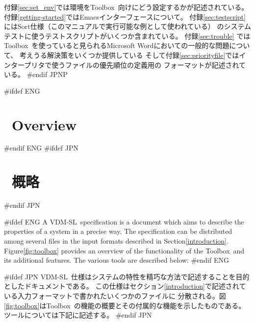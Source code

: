 \documentclass[\pformat,12pt]{article}
\newcommand{\vdmslpp}{VDM-SL}
\newcommand{\Toolbox}{Toolbox}
\newcommand{\vdmslpp}{VDM++}
\newcommand{\Toolbox}{Toolbox}
\begin{document}
付録\ref{sec:set_env}では環境を\Toolbox\ 向けにどう設定するかが記述されている。
付録\ref{getting-started}ではEmacsインターフェースについて。
付録\ref{sec:testscript}にはSort仕様（このマニュアルで実行可能な例として使われている）
のシステムテストに使うテストスクリプトがいくつか含まれている。
付録\ref{sec:trouble} では\Toolbox\ を使っていると見られるMicrosoft Wordにおいての一般的な問題について、
考えうる解決策をいくつか提供している
{そして付録\ref{sec:priorityfile}ではインタープリタで使うファイルの優先順位の定義用の
フォーマットが記述されている。}
#endif JPNP

\newpage

#ifdef ENG
\section{\protect\VDMTools\ Overview}\label{sec:overview}
#endif ENG
#ifdef JPN
\section{\protect\VDMTools\ 概略}\label{sec:overview}
#endif JPN

#ifdef ENG
A \vdmslpp\ specification is a document which aims to describe the
properties of a system in a precise way. The specification can be
distributed among several files in the input formats described in
Section\ref{introduction}.  Figure\ref{fig:toolbox} provides an
overview of the functionality of the \Toolbox\ and its additional
features. The various tools are described below:
#endif ENG

#ifdef JPN
\vdmslpp\ 仕様はシステムの特性を精巧な方法で記述することを目的としたドキュメントである。
この仕様はセクション\ref{introduction}で記述されている入力フォーマットで書かれたいくつかのファイルに
分散される。図\ref{fig:toolbox}は\Toolbox\ の機能の概要とその付属的な機能を示したものである。
ツールについては下記に記述する。
#endif JPN
\end{document}
